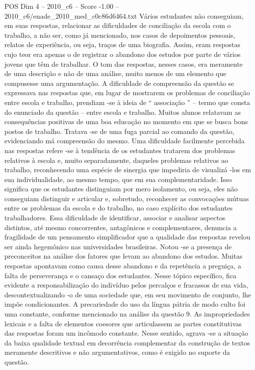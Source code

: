 \begin{textsample}{POS Dim 4 – 2010\_c6 – Score -1.00 – 2010\_c6/enade\_2010\_med\_c0c86d6464.txt}
Vários estudantes não conseguiam, em suas respostas, relacionar as dificuldades de conciliação da escola com o trabalho, a não ser, como já mencionado, nos casos de depoimentos pessoais, relatos de experiência, ou seja, traços de uma biografia.
Assim, eram respostas cujo teor era apenas o de registrar o abandono dos estudos por parte de vários jovens que têm de trabalhar.
O tom das respostas, nesses casos, era meramente de uma descrição e não de uma análise, muito menos de um elemento que compusesse uma argumentação.
A dificuldade de compreensão da questão se expressava nas respostas que, em lugar de mostrarem os problemas de conciliação entre escola e trabalho, prendiam -se à ideia de “ associação ” – termo que consta do enunciado da questão – entre escola e trabalho.
Muitos alunos relatavam as consequências positivas de uma boa educação no momento em que se busca bons postos de trabalho.
Tratava -se de uma fuga parcial ao comando da questão, evidenciando má compreensão do mesmo.
Uma dificuldade facilmente percebida nas respostas refere -se à tendência de os estudantes tratarem dos problemas relativos à escola e, muito separadamente, daqueles problemas relativos ao trabalho, reconhecendo uma espécie de sinergia que impediria de visualizá -los em sua individualidade, ao mesmo tempo, que em sua complementaridade.
Isso significa que os estudantes distinguiam por mero isolamento, ou seja, eles não conseguiam distinguir e articular e, sobretudo, reconhecer as convocações mútuas entre os problemas da escola e do trabalho, no caso explícito dos estudantes trabalhadores.
Essa dificuldade de identificar, associar e analisar aspectos distintos, até mesmo concorrentes, antagônicos e complementares, denuncia a fragilidade de um pensamento simplificador que a qualidade das respostas revelou ser ainda hegemônico nas universidades brasileiras.
Notou -se a presença de preconceitos na análise dos fatores que levam ao abandono dos estudos.
Muitas respostas apontavam como causa desse abandono e da repetência a preguiça, a falta de perseverança e o cansaço dos estudantes.
Nesse tópico específico, fica evidente a responsabilização do indivíduo pelos percalços e fracassos de sua vida, descontextualizando -o de uma sociedade que, em seu movimento de conjunto, lhe impõe condicionantes.
A precariedade do uso da língua pátria de modo culto foi uma constante, conforme mencionado na análise da questão 9.
As impropriedades lexicais e a falta de elementos coesores que articulassem as partes constitutivas das respostas foram um incômodo constante.
Nesse sentido, agrava -se a situação da baixa qualidade textual em decorrência complementar da construção de textos meramente descritivos e não argumentativos, como é exigido no suporte da questão.

\end{textsample}
